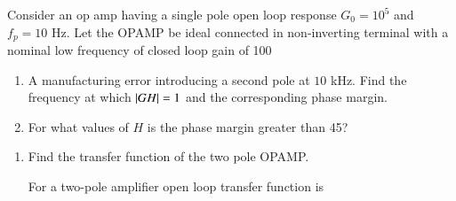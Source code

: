 Consider an op amp having a single pole open loop response $G_{0} = 10^5$ and $f_{p} = 10$ Hz.  Let the OPAMP be ideal connected in non-inverting terminal with a nominal low frequency of closed loop gain of 100 
\begin{enumerate}
\item A manufacturing error introducing a second pole at $10$ kHz. Find the frequency at which $\left\vert GH\right\vert = 1$ and the corresponding phase margin.
\item For what values of $H$ is the phase margin greater than 45\degree ?
\end{enumerate}
\begin{enumerate}[label=\arabic*.,ref=\theenumi]

\item Find the transfer function of the two pole OPAMP.

\solution 
For a two-pole amplifier open loop transfer function is 


\end{enumerate}
